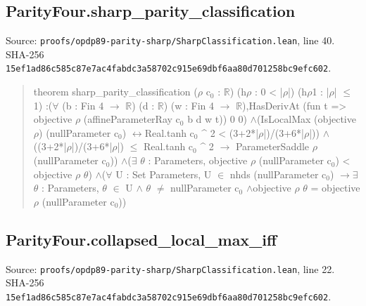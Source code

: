\documentclass[11pt,a4paper]{article}
\begin{document}
\subsection{ParityFour.sharp\_parity\_classification}
Source: \texttt{proofs/opdp89-parity-sharp/SharpClassification.lean}, line 40. SHA-256 \texttt{15ef1ad86c585c87e7ac4fabdc3a58702c915e69dbf6aa80d701258bc9efc602}.

\begin{quote}\small\ttfamily theorem sharp\_parity\_classification (\ensuremath{\rho} c\ensuremath{_0} : \ensuremath{\mathbb{R}}) (h\ensuremath{\rho} : 0 < |\ensuremath{\rho}|) (h\ensuremath{\rho}1 : |\ensuremath{\rho}| \ensuremath{\leq} 1) :\newline (\ensuremath{\forall} (b : Fin 4 \ensuremath{\to} \ensuremath{\mathbb{R}}) (d : \ensuremath{\mathbb{R}}) (w : Fin 4 \ensuremath{\to} \ensuremath{\mathbb{R}}),\newline HasDerivAt (fun t => objective \ensuremath{\rho} (affineParameterRay c\ensuremath{_0} b d w t)) 0 0) \ensuremath{\wedge}\newline (IsLocalMax (objective \ensuremath{\rho}) (nullParameter c\ensuremath{_0}) \ensuremath{\leftrightarrow}\newline Real.tanh c\ensuremath{_0} \textasciicircum{} 2 < (3+2*|\ensuremath{\rho}|)/(3+6*|\ensuremath{\rho}|)) \ensuremath{\wedge}\newline ((3+2*|\ensuremath{\rho}|)/(3+6*|\ensuremath{\rho}|) \ensuremath{\leq} Real.tanh c\ensuremath{_0} \textasciicircum{} 2 \ensuremath{\to} ParameterSaddle \ensuremath{\rho} (nullParameter c\ensuremath{_0})) \ensuremath{\wedge}\newline (\ensuremath{\exists} \ensuremath{\theta} : Parameters, objective \ensuremath{\rho} (nullParameter c\ensuremath{_0}) < objective \ensuremath{\rho} \ensuremath{\theta}) \ensuremath{\wedge}\newline (\ensuremath{\forall} U : Set Parameters, U \ensuremath{\in} nhds (nullParameter c\ensuremath{_0}) \ensuremath{\to}\newline \ensuremath{\exists} \ensuremath{\theta} : Parameters, \ensuremath{\theta} \ensuremath{\in} U \ensuremath{\wedge} \ensuremath{\theta} \ensuremath{\neq} nullParameter c\ensuremath{_0} \ensuremath{\wedge}\newline objective \ensuremath{\rho} \ensuremath{\theta} = objective \ensuremath{\rho} (nullParameter c\ensuremath{_0}))\end{quote}
\subsection{ParityFour.collapsed\_local\_max\_iff}
Source: \texttt{proofs/opdp89-parity-sharp/SharpClassification.lean}, line 22. SHA-256 \texttt{15ef1ad86c585c87e7ac4fabdc3a58702c915e69dbf6aa80d701258bc9efc602}.
\end{document}
